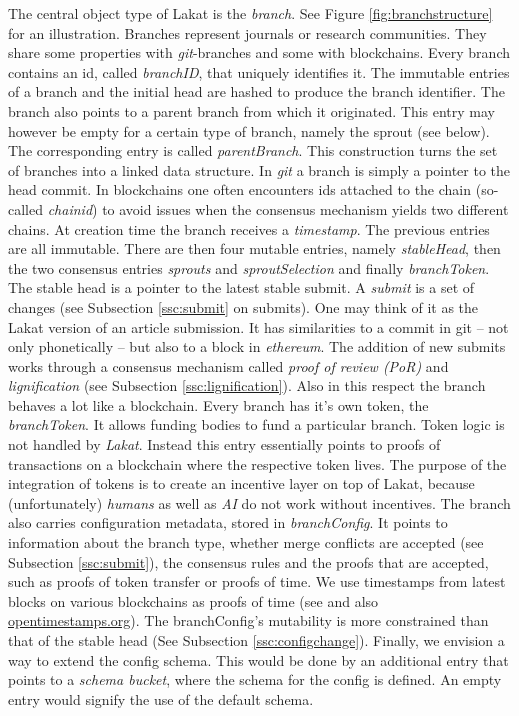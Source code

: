 The central object type of Lakat is the \textit{branch}. See Figure \ref{fig:branchstructure} for an illustration. Branches represent journals or research communities. They share some properties with \textit{git}-branches and some with blockchains. Every branch contains an id, called \textit{branchID}, that uniquely identifies it. The immutable entries of a branch and the initial head are hashed to produce the branch identifier. The branch also points to a parent branch from which it originated. This entry may however be empty for a certain type of branch, namely the sprout (see below). The corresponding entry is called \textit{parentBranch}. This construction turns the set of branches into a linked data structure. In \textit{git} a branch is simply a pointer to the head commit. In blockchains one often encounters ids attached to the chain (so-called \textit{chainid}) to avoid issues when the consensus mechanism yields two different chains. At creation time the branch receives a \textit{timestamp}. The previous entries are all immutable. There are then four mutable entries, namely \textit{stableHead}, then the two consensus entries \textit{sprouts} and \textit{sproutSelection} and finally \textit{branchToken}. The stable head is a pointer to the latest stable submit. A \textit{submit} is a set of changes (see Subsection \ref{ssc:submit} on submits). One may think of it as the Lakat version of an article submission. It has similarities to a commit in git -- not only phonetically -- but also to a block in \textit{ethereum}. The addition of new submits works through a consensus mechanism called \textit{proof of review (PoR)} and \textit{lignification} (see Subsection \ref{ssc:lignification}). Also in this respect the branch behaves a lot like a blockchain. Every branch has it's own token, the \textit{branchToken}. It allows funding bodies to fund a particular branch. Token logic is not handled by \textit{Lakat}. Instead this entry essentially points to proofs of transactions on a blockchain where the respective token lives. The purpose of the integration of tokens is to create an incentive layer on top of Lakat, because (unfortunately) \textit{humans} as well as \textit{AI} do not work without incentives. The branch also carries configuration metadata, stored in \textit{branchConfig}. It points to information about the branch type, whether merge conflicts are accepted (see Subsection \ref{ssc:submit}), the consensus rules and the proofs that are accepted, such as proofs of token transfer or proofs of time. We use timestamps from latest blocks on various blockchains as proofs of time (see \cite{gipp2015decentralized} and also  \href{https://opentimestamps.org/}{opentimestamps.org}). The branchConfig's mutability is more constrained than that of the stable head (See Subsection \ref{ssc:configchange}).
Finally, we envision a way to extend the config schema. This would be done by an additional entry that points to a \textit{schema bucket}, where the schema for the config is defined. An empty entry would signify the use of the default schema.



